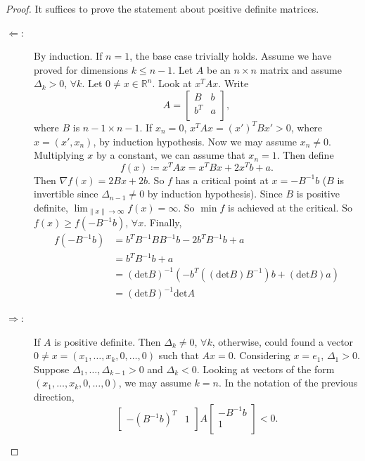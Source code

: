 \documentclass[12pt]{article}
\theoremstyle{plain}
\theoremstyle{definition}
\begin{document}
\begin{proof}
    It suffices to prove the statement about positive definite matrices.
    \begin{description}
        \item[$\Leftarrow$:]
            By induction.
            If $n=1$, the base case trivially holds.
            Assume we have proved for dimensions $k\leq n-1$.
            Let $A$ be an $n\times n$ matrix and assume $\Delta_k>0$, $\forall k$.
            Let $0\neq x\in \mathbb{R}^n$.
            Look at $x^TAx$.
            Write
            \[
                A=\begin{bmatrix}
                    B & b\\
                    b^T&a\\
                \end{bmatrix},
            \]
            where $B$ is $n-1\times n-1$.
            If $x_n=0$, $x^TAx = (x')^TBx' > 0$, where $x=(x',x_n)$, by induction hypothesis.
            Now we may assume $x_n\neq 0$.
            Multiplying $x$ by a constant, we can assume that $x_n=1$.
            Then define
            \[
                f(x)\coloneqq x^TAx = x^TBx + 2x^Tb+a.
            \]
            Then $\nabla f(x) = 2Bx + 2b$.
            So $f$ has a critical point at $x=-B^{-1}b$ ($B$ is invertible since $\Delta_{n-1}\neq 0$ by induction hypothesis).
            Since $B$ is positive definite, $\lim_{\|x\|\rightarrow\infty} f(x)=\infty$.
            So $\min f$ is achieved at the critical.
            So $f(x)\geq f(-B^{-1}b)$, $\forall x$.
            Finally,
            \[\begin{aligned}
                    f(-B^{-1}b) &= b^TB^{-1}BB^{-1}b-2b^TB^{-1}b+a\\
                                &= b^TB^{-1}b+a\\
                                &= (\text{det}B)^{-1}(-b^T((\text{det}B) B^{-1})b + (\text{det}B) a)\\
                                &= (\text{det}B)^{-1} \text{det}A
            \end{aligned}\]
        \item[$\Rightarrow$:]
            If $A$ is positive definite.
            Then $\Delta_k\neq 0$, $\forall k$, otherwise, could found a vector $0\neq x=(x_1,\ldots,x_k,0,\ldots,0)$ such that $Ax=0$.
            Considering $x=e_1$, $\Delta_1>0$.
            Suppose $\Delta_1,\ldots,\Delta_{k-1}>0$ and $\Delta_k<0$.
            Looking at vectors of the form $(x_1,\ldots,x_k,0,\ldots,0)$, we may assume $k=n$.
            In the notation of the previous direction,
            \[
                \begin{bmatrix}
                    -(B^{-1}b)^T&1
                \end{bmatrix}
                A 
                \begin{bmatrix}
                    -B^{-1}b\\
                    1\\
                \end{bmatrix}
                < 0.
            \]
    \end{description}
\end{proof}
\end{document}
